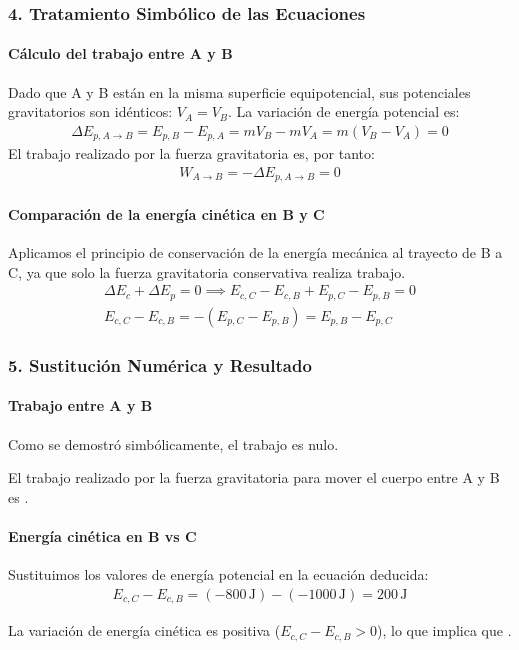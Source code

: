 \subsubsection*{4. Tratamiento Simbólico de las Ecuaciones}
\paragraph*{Cálculo del trabajo entre A y B}
Dado que A y B están en la misma superficie equipotencial, sus potenciales gravitatorios son idénticos: $V_A = V_B$. La variación de energía potencial es:
\begin{gather}
    \Delta E_{p, A \to B} = E_{p,B} - E_{p,A} = m V_B - m V_A = m(V_B - V_A) = 0
\end{gather}
El trabajo realizado por la fuerza gravitatoria es, por tanto:
\begin{gather}
    W_{A \to B} = -\Delta E_{p, A \to B} = 0
\end{gather}

\paragraph*{Comparación de la energía cinética en B y C}
Aplicamos el principio de conservación de la energía mecánica al trayecto de B a C, ya que solo la fuerza gravitatoria conservativa realiza trabajo.
\begin{gather}
    \Delta E_c + \Delta E_p = 0 \implies E_{c,C} - E_{c,B} + E_{p,C} - E_{p,B} = 0 \nonumber \\
    E_{c,C} - E_{c,B} = -(E_{p,C} - E_{p,B}) = E_{p,B} - E_{p,C}
\end{gather}

\subsubsection*{5. Sustitución Numérica y Resultado}
\paragraph*{Trabajo entre A y B}
Como se demostró simbólicamente, el trabajo es nulo.
\begin{cajaresultado}
    El trabajo realizado por la fuerza gravitatoria para mover el cuerpo entre A y B es .
\end{cajaresultado}

\paragraph*{Energía cinética en B vs C}
Sustituimos los valores de energía potencial en la ecuación deducida:
\begin{gather}
    E_{c,C} - E_{c,B} = (-800 \, \text{J}) - (-1000 \, \text{J}) = 200 \, \text{J}
\end{gather}
\begin{cajaresultado}
    La variación de energía cinética es positiva ($E_{c,C} - E_{c,B} > 0$), lo que implica que .
\end{cajaresultado}

